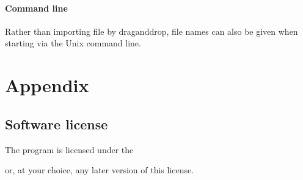 \documentclass[letterpaper,10pt,english]{sphinxmanual}
\begin{document}
\subsection{Command line}
\label{\detokenize{03-reference/platform:command-line}}
\sphinxAtStartPar
Rather than importing file by drag\sphinxhyphen{}and\sphinxhyphen{}drop, file names can also be given when
starting  via the Unix command line.

\part{Appendix}


\chapter{Software license}
\label{\detokenize{04-appendix/license_enroute:software-license}}\label{\detokenize{04-appendix/license_enroute::doc}}
\sphinxAtStartPar
The program  is licensed under the %
\begin{footnote}[20]\sphinxAtStartFootnote
{}
%
\end{footnote} or,
at your choice, any later version of this license.
\end{document}
